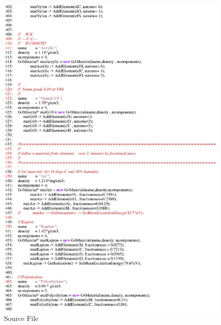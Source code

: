 \begin{figure}[h]
  \hspace{0cm}
  \includegraphics[scale=0.8]{./figures17/QweakSimMaterial.cc-p7.eps}
  \caption{\label{SourceXVII8} Source File}
           \label{fig:XVII-SC-8}
\end{figure}
\clearpage

